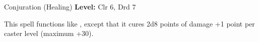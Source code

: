 {Conjuration (Healing)}
{
	\textbf{Level:}
	Clr 6, Drd 7\\
}
{
	This spell functions like , except that it cures 2d8 points of damage +1 point per caster level (maximum +30).

}
